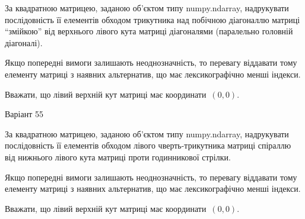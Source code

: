 \documentclass[11pt]{article}
\begin{document}
За квадратною матрицею, заданою об'єктом типу numpy.ndarray, надрукувати послідовність її елементів обходом трикутника над побічною діагоналлю матриці ``змійкою'' від верхнього лівого кута матриці діагоналями (паралельно головній діагоналі).

\vspace{2mm}
Якщо попередні вимоги залишають неоднозначність, то перевагу віддавати тому елементу матриці з наявних альтернатив, що має лексикографічно менші індекси.

Вважати, що лівий верхній кут матриці має координати~$(0,0)$.



{\Large \center  Варіант  55\par \bigskip\bigskip}

За квадратною матрицею, заданою об'єктом типу numpy.ndarray, надрукувати послідовність її елементів обходом лівого чверть-трикутника матриці спіраллю від нижнього лівого кута матриці проти годинникової стрілки.

\vspace{2mm}
Якщо попередні вимоги залишають неоднозначність, то перевагу віддавати тому елементу матриці з наявних альтернатив, що має лексикографічно менші індекси.

Вважати, що лівий верхній кут матриці має координати~$(0,0)$.



\end{document}
